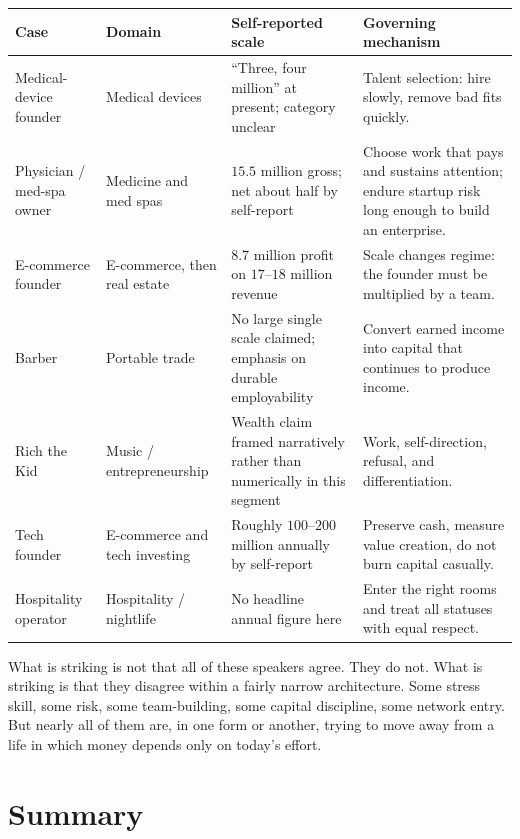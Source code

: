 \begin{table}[h]
\centering
\begin{tabular}{|p{}|p{}|p{}|p{}|}
\hline
Case & Domain & Self-reported scale & Governing mechanism \\
\hline
Medical-device founder & Medical devices & ``Three, four million'' at present; category unclear & Talent selection: hire slowly, remove bad fits quickly. \\
\hline
Physician / med-spa owner & Medicine and med spas & \(15.5\) million gross; net about half by self-report & Choose work that pays and sustains attention; endure startup risk long enough to build an enterprise. \\
\hline
E-commerce founder & E-commerce, then real estate & \(8.7\) million profit on \(17\text{--}18\) million revenue & Scale changes regime: the founder must be multiplied by a team. \\
\hline
Barber & Portable trade & No large single scale claimed; emphasis on durable employability & Convert earned income into capital that continues to produce income. \\
\hline
Rich the Kid & Music / entrepreneurship & Wealth claim framed narratively rather than numerically in this segment & Work, self-direction, refusal, and differentiation. \\
\hline
Tech founder & E-commerce and tech investing & Roughly \(100\text{--}200\) million annually by self-report & Preserve cash, measure value creation, do not burn capital casually. \\
\hline
Hospitality operator & Hospitality / nightlife & No headline annual figure here & Enter the right rooms and treat all statuses with equal respect. \\
\hline
\end{tabular}
\end{table}

What is striking is not that all of these speakers agree. They do not. What is striking is that they disagree within a fairly narrow architecture. Some stress skill, some risk, some team-building, some capital discipline, some network entry. But nearly all of them are, in one form or another, trying to move away from a life in which money depends only on today's effort.

\section{Summary}

